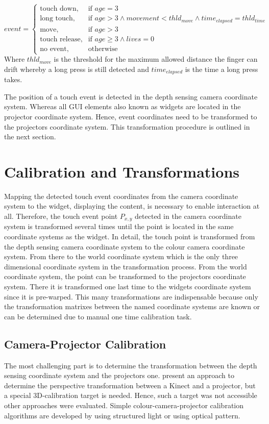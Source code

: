\[
    \mathit{event}= 
\begin{cases}
    \text{touch down},& \text{if }  \mathit{age} = 3 \\
    \text{long touch}, & \text{if } \mathit{age} > 3 \wedge \mathit{movement}<\mathit{thld}_{move} \wedge \mathit{time}_{elapsed} =  {thld}_{time}\\
    \text{move}, & \text{if } \mathit{age} > 3\\
    \text{touch release},& \text{if } \mathit{age}  \geq 3 \wedge \mathit{lives} =0\\   
    \text{no event},& \text{otherwise}
\end{cases}
\]
Where $\mathit{thld}_{move}$ is the threshold for the maximum allowed distance the finger can drift whereby a long press is still detected and $\mathit{time}_{elapsed}$ is the time a long press takes.

The position of a touch event is detected in the depth sensing camera coordinate system. Whereas all \ac{GUI} elements also known as widgets are located in the projector coordinate system. Hence, event coordinates need to be transformed to the projectors coordinate system. This transformation procedure is outlined in the next section.

\section{Calibration and Transformations}
Mapping the detected touch event coordinates from the camera coordinate system to the widget, displaying the content, is necessary to enable interaction at all. Therefore, the touch event point $P_{x,y}$ detected in the camera coordinate system is transformed several times until the point is located in the same coordinate systems as the widget. In detail, the touch point is transformed from the depth sensing camera coordinate system to the colour camera coordinate system. From there to the world coordinate system which is the only three dimensional coordinate system in the transformation process. From the world coordinate system, the point can be transformed to the projectors coordinate system. There it is transformed one last time to the widgets coordinate system since it is pre-warped. This many transformations are indispensable because only the transformation matrixes between the named coordinate systems are known or can be determined due to manual one time calibration task.

\subsection{Camera-Projector Calibration}
The most challenging part is to determine the transformation between the depth sensing coordinate system and the projectors one. \textcite{Xiao:2013dp} present an approach to determine the perspective transformation between a Kinect and a projector, but a special 3D-calibration target is needed. Hence, such a target was not accessible other approaches were evaluated. 
Simple colour-camera-projector calibration algorithms are developed by \textcite{LegardaSaenz:2004hn,Gao:2008jn,Li:2008kr} using structured light or \textcite{Ashdown:2005dx,Griesser:2006ko,Audet:2009ee} using optical pattern.

